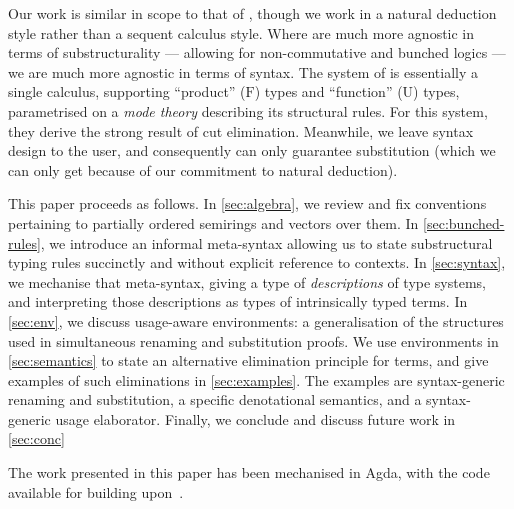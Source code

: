 Our work is similar in scope to that of \citet{LicataSR17}, though we work in
a natural deduction style rather than a sequent calculus style.
Where \citeauthor{LicataSR17} are much more agnostic in terms of
substructurality --- allowing for non-commutative and bunched logics ---
we are much more agnostic in terms of syntax.
The system of \citeauthor{LicataSR17} is essentially a single calculus,
supporting ``product'' ($\mathrm F$) types and ``function'' ($\mathrm U$)
types, parametrised on a \emph{mode theory} describing its structural rules.
For this system, they derive the strong result of cut elimination.
Meanwhile, we leave syntax design to the user, and consequently can only
guarantee substitution (which we can only get because of our commitment to
natural deduction).

This paper proceeds as follows.
In \cref{sec:algebra}, we review and fix conventions pertaining to partially
ordered semirings and vectors over them.
In \cref{sec:bunched-rules}, we introduce an informal meta-syntax allowing us
to state substructural typing rules succinctly and without explicit reference
to contexts.
In \cref{sec:syntax}, we mechanise that meta-syntax, giving a type of
\emph{descriptions} of type systems, and interpreting those descriptions as
types of intrinsically typed terms.
In \cref{sec:env}, we discuss usage-aware environments: a generalisation of
the structures used in simultaneous renaming and substitution proofs.
We use environments in \cref{sec:semantics} to state an alternative
elimination principle for terms, and give examples of such eliminations in
\cref{sec:examples}.
The examples are syntax-generic renaming and substitution, a specific
denotational semantics, and a syntax-generic usage elaborator.
Finally, we conclude and discuss future work in \cref{sec:conc}

The work presented in this paper has been mechanised in Agda,
with the code available for building upon~\cite{generic-lr}.
